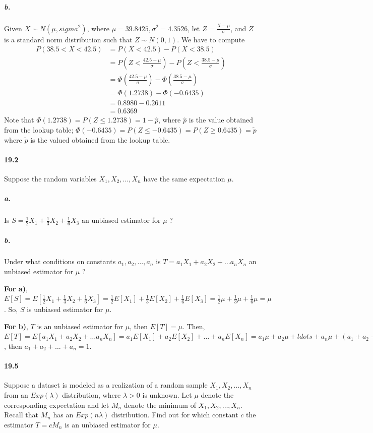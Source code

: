 \documentclass{article} %
\begin{document}
\subparagraph*{b.}
Given $X \sim N(\mu, sigma^2)$, where $\mu=39.8425, \sigma^2=4.3526$, let $Z = \frac{X-\mu}{\sigma}$, and $Z$ is a standard norm distribution such that $Z \sim N(0, 1)$. We have to compute 
\begin{align*}
P(38.5<X<42.5) & = P(X<42.5) - P(X < 38.5) \\
& = P(Z < \frac{42.5-\mu}{\sigma}) - P(Z < \frac{38.5-\mu}{\sigma})\\
& = \Phi(\frac{42.5-\mu}{\sigma}) - \Phi(\frac{38.5-\mu}{\sigma}) \\
& = \Phi(1.2738) - \Phi( -0.6435) \\
& = 0.8980 - 0.2611 \\
& = 0.6369
\end{align*}
Note that $\Phi(1.2738)=P(Z\leq 1.2738) = 1-\hat{p}$, where $\hat{p}$ is the value obtained from the lookup table; 
$\Phi(-0.6435) = P(Z \leq -0.6435) = P(Z \geq 0.6435) = \tilde{p}$ where $\tilde{p}$ is the valued obtained from the lookup table. 

\paragraph*{19.2} Suppose the random variables $X_1, X_2, \ldots, X_n$ have the same expectation $\mu$. 
\subparagraph*{a.} Is $S=\frac{1}{2}X_1 + \frac{1}{3}X_2 + \frac{1}{6}X_3$ an unbiased estimator for $\mu$ ?
\subparagraph*{b.} Under what conditions on constants $a_1, a_2, \ldots, a_n$ is $T=a_1X_1 + a_2 X_2 + \ldots a_nX_n$ an unbiased estimator for $\mu$ ?

{\bf For a)}, $E[S] = E[\frac{1}{2}X_1 + \frac{1}{3}X_2 + \frac{1}{6}X_3] = \frac{1}{2}E[X_1] + \frac{1}{3}E[X_2] +\frac{1}{6}E[X_3] = \frac{1}{2}\mu + \frac{1}{3}\mu + \frac{1}{6}\mu = \mu$. So, $S$ is unbiased estimator for $\mu$. 

{\bf For b)}, $T$ is an unbiased estimator for $\mu$, then $E[T] = \mu$. Then, $E[T]=E[a_1X_1 + a_2 X_2 + \ldots a_nX_n] = a_1E[X_1] + a_2 E[X_2] + \ldots + a_nE[X_n] = a_1\mu + a_2 \mu + ldots + a_n \mu + \left( a_1 + a_2 + \ldots + a_n\right) \mu = \mu $, then $a_1 + a_2 + \ldots + a_n = 1$. 

\paragraph*{19.5} Suppose a dataset is modeled as a realization of a random sample $X_1, X_2, \ldots, X_n$ from an $Exp(\lambda)$ distribution, where $\lambda >0 $ is unknown. Let $\mu$ denote the corresponding expectation and let $M_n$ denote the minimum of $X_1, X_2, \ldots, X_n$. Recall that $M_n$ has an $Exp(n\lambda)$ distribution. Find out for which constant $c$ the estimator $T=cM_n$ is an unbiased estimator for $\mu$. 
\end{document}
